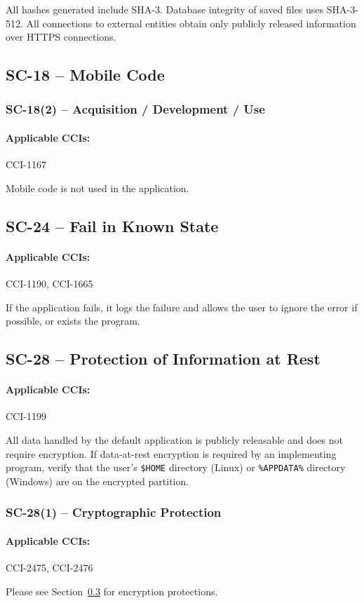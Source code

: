 \documentclass[letterpaper, 10pt, twoside]{article}
\begin{document}
All hashes generated include SHA-3. Database integrity of saved files uses SHA-3-512. All connections to external entities obtain only publicly released information over HTTPS connections.

\subsection{SC-18 -- Mobile Code}

\subsubsection{SC-18(2) -- Acquisition / Development / Use}

\paragraph{Applicable CCIs:} CCI-1167

Mobile code is not used in the application.

\subsection{SC-24 -- Fail in Known State}

\paragraph{Applicable CCIs:} CCI-1190, CCI-1665

If the application fails, it logs the failure and allows the user to ignore the error if possible, or exists the program.

\subsection{SC-28 -- Protection of Information at Rest}
\label{sec:sc-28}

\paragraph{Applicable CCIs:} CCI-1199

All data handled by the default application is publicly releasable and does not require encryption. If data-at-rest encryption is required by an implementing program, verify that the user's \texttt{\$HOME} directory (Linux) or \texttt{\%APPDATA\%} directory (Windows) are on the encrypted partition.

\subsubsection{SC-28(1) -- Cryptographic Protection}

\paragraph{Applicable CCIs:} CCI-2475, CCI-2476

Please see Section~\ref{sec:sc-28} for encryption protections.

\clearpage
\printbibliography
\end{document}
